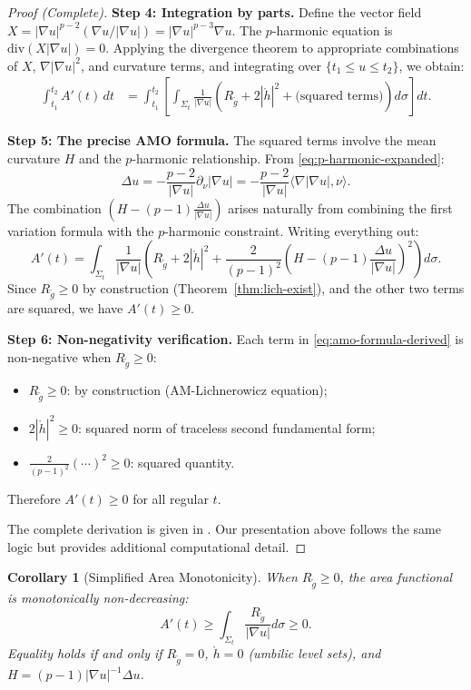\documentclass[12pt]{article}
\theoremstyle{plain}
\newtheorem{corollary}[theorem]{Corollary}
\theoremstyle{definition}
\theoremstyle{remark}
\newcommand{\Div}{\mathrm{div}}
\newcommand{\tg}{\tilde{g}}
\begin{document}
\begin{proof}[Proof (Complete)]
\textbf{Step 4: Integration by parts.}
Define the vector field $X = |\nabla u|^{p-2}(\nabla u / |\nabla u|) = |\nabla u|^{p-3}\nabla u$. The $p$-harmonic equation is $\Div(X|\nabla u|) = 0$. Applying the divergence theorem to appropriate combinations of $X$, $\nabla|\nabla u|^2$, and curvature terms, and integrating over $\{t_1 \leq u \leq t_2\}$, we obtain:
\begin{align*}
\int_{t_1}^{t_2} A'(t) \, dt &= \int_{t_1}^{t_2}\left[\int_{\Sigma_t} \frac{1}{|\nabla u|}\left(R_{\tg} + 2|\mathring{h}|^2 + \text{(squared terms)}\right) d\sigma\right] dt.
\end{align*}

\textbf{Step 5: The precise AMO formula.}
The squared terms involve the mean curvature $H$ and the $p$-harmonic relationship. From \eqref{eq:p-harmonic-expanded}:
\[
\Delta u = -\frac{p-2}{|\nabla u|}\partial_\nu |\nabla u| = -\frac{p-2}{|\nabla u|}\langle \nabla|\nabla u|, \nu\rangle.
\]
The combination $(H - (p-1)\frac{\Delta u}{|\nabla u|})$ arises naturally from combining the first variation formula with the $p$-harmonic constraint. Writing everything out:
\begin{equation}\label{eq:amo-formula-derived}
A'(t) = \int_{\Sigma_t} \frac{1}{|\nabla u|}\left(R_{\tg} + 2|\mathring{h}|^2 + \frac{2}{(p-1)^2}\left(H - (p-1)\frac{\Delta u}{|\nabla u|}\right)^2\right) d\sigma.
\end{equation}
Since $R_{\tg} \geq 0$ by construction (Theorem~\ref{thm:lich-exist}), and the other two terms are squared, we have $A'(t) \geq 0$.

\textbf{Step 6: Non-negativity verification.}
Each term in \eqref{eq:amo-formula-derived} is non-negative when $R_{\tg} \geq 0$:
\begin{itemize}
    \item $R_{\tg} \geq 0$: by construction (AM-Lichnerowicz equation);
    \item $2|\mathring{h}|^2 \geq 0$: squared norm of traceless second fundamental form;
    \item $\frac{2}{(p-1)^2}(\cdots)^2 \geq 0$: squared quantity.
\end{itemize}
Therefore $A'(t) \geq 0$ for all regular $t$.

The complete derivation is given in \cite[Theorem 3.1]{amo2022}. Our presentation above follows the same logic but provides additional computational detail.
\end{proof}

\begin{corollary}[Simplified Area Monotonicity]\label{cor:area-mono}
When $R_{\tg} \geq 0$, the area functional is monotonically non-decreasing:
\[
A'(t) \geq \int_{\Sigma_t} \frac{R_{\tg}}{|\nabla u|} d\sigma \geq 0.
\]
Equality holds if and only if $R_{\tg} = 0$, $\mathring{h} = 0$ (umbilic level sets), and $H = (p-1)|\nabla u|^{-1}\Delta u$.
\end{corollary}
\end{document}
